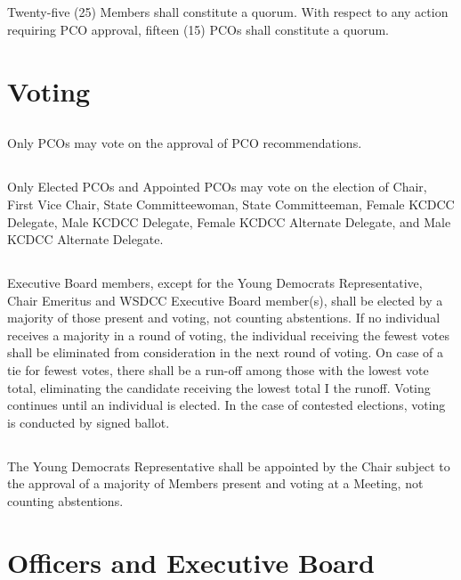 \documentclass{article}
\begin{document}
\subsection{}
Twenty-five (25) Members shall constitute a quorum. With respect to any action requiring PCO approval, fifteen (15) PCOs shall constitute a quorum.

\section{Voting}
\subsection{}
Only PCOs may vote on the approval of PCO recommendations.

\subsection{}
Only Elected PCOs and Appointed PCOs may vote on the election of Chair, First Vice Chair, State Committeewoman, State Committeeman, Female KCDCC Delegate, Male KCDCC Delegate, Female KCDCC Alternate Delegate, and Male KCDCC Alternate Delegate.

\subsection{}
Executive Board members, except for the Young Democrats Representative, Chair Emeritus and WSDCC Executive Board member(s), shall be elected by a majority of those present and voting, not counting abstentions. If no individual receives a majority in a round of voting, the individual receiving the fewest votes shall be eliminated from consideration in the next round of voting. On case of a tie for fewest votes, there shall be a run-off among those with the lowest vote total, eliminating the candidate receiving the lowest total I the runoff.  Voting continues until an individual is elected. In the case of contested elections, voting is conducted by signed ballot.

\subsection{}
The Young Democrats Representative shall be appointed by the Chair subject to the approval of a majority of Members present and voting at a Meeting, not counting abstentions.
\section{Officers and Executive Board}
\end{document}
